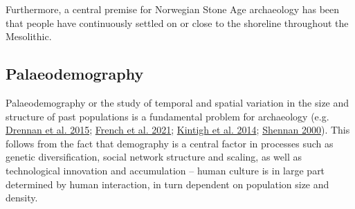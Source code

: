\documentclass[
  12pt,
  a4paper,
  oneside]{book}
\begin{document}
Furthermore, a central premise for Norwegian Stone Age archaeology has been that people have continuously settled on or close to the shoreline throughout the Mesolithic.

\hypertarget{palaeodemography}{%
\subsection{Palaeodemography}\label{palaeodemography}}

Palaeodemography or the study of temporal and spatial variation in the size and structure of past populations is a fundamental problem for archaeology (e.g. \protect\hyperlink{ref-drennan2015}{Drennan et al. 2015}; \protect\hyperlink{ref-french2021}{French et al. 2021}; \protect\hyperlink{ref-kintigh2014}{Kintigh et al. 2014}; \protect\hyperlink{ref-shennan2000}{Shennan 2000}). This follows from the fact that demography is a central factor in processes such as genetic diversification, social network structure and scaling, as well as technological innovation and accumulation -- human culture is in large part determined by human interaction, in turn dependent on population size and density.
\end{document}

